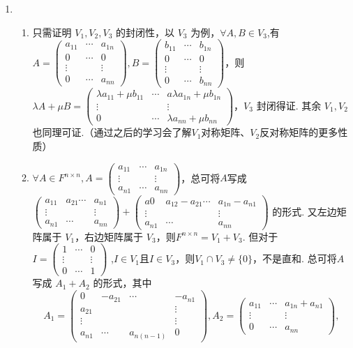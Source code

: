 \begin{enumerate}
    \item \begin{enumerate}
        \item 只需证明 $V_1,V_2,V_3$ 的封闭性，以 $V_3$ 为例，$\forall A,B\in V_3$,有 $A=\begin{pmatrix}a_{11}&\cdots&a_{1n}\\0&\cdots&0\\ \vdots& &\vdots\\0&\cdots& a_{nn}\end{pmatrix},B=\begin{pmatrix}b_{11}&\cdots&b_{1n}\\0&\cdots&0\\ \vdots& &\vdots\\0&\cdots& b_{nn}\end{pmatrix}$，则 $\lambda A+\mu B=\begin{pmatrix}\lambda a_{11}+\mu b_{11}&\cdots&a\lambda a_{1n}+\mu b_{1n}\\ \vdots& &\vdots\\0&\cdots& \lambda a_{nn}+\mu b_{nn}\end{pmatrix}$，$V_3$ 封闭得证.	其余 $V_1,V_2$ 也同理可证.（通过之后的学习会了解$V_1$对称矩阵、$V_2$反对称矩阵的更多性质）
        \item $\forall A\in F^{n\times n},A=\begin{pmatrix}a_{11}&\cdots&a_{1n}\\ \vdots& &\vdots\\a_{n1}&\cdots&a_{nn}\end{pmatrix}$，总可将$A$写成 $\begin{pmatrix}a_{11}&a_{21}\cdots&a_{n1}\\ \vdots& &\vdots\\a_{n1}&\cdots&a_{nn}\end{pmatrix}+\begin{pmatrix}a0&a_{12}-a_{21}\cdots&a_{1n}-a_{n1}\\ \vdots& &\vdots\\a_{n1}&\cdots&a_{nn}\end{pmatrix}$ 的形式. 又左边矩阵属于 $V_1$，右边矩阵属于 $V_3$，则$F^{n×n}=V_1+V_3$.
        但对于 $I=\begin{pmatrix}1&\cdots&0\\ \vdots& &\vdots\\0&\cdots&1\end{pmatrix} $ ,$I∈V_1$且$I∈V_3$，则$V_1\cap V_3\ne\{0\}$，不是直和. 总可将$A$写成 $A_1+A_2$ 的形式，其中
        \[A_1=\begin{pmatrix}0&-a_{21}&\cdots&-a_{n1}\\ a_{21}&&&\vdots\\ \vdots&& &\vdots\\a_{n1}&\cdots&a_{n(n-1)}&0\end{pmatrix},A_2=\begin{pmatrix}a_{11}&\cdots&a_{1n}+a_{n1}\\ \vdots& &\vdots\\0&\cdots&a_{nn}\end{pmatrix},\]

\end{enumerate}
\end{enumerate}
